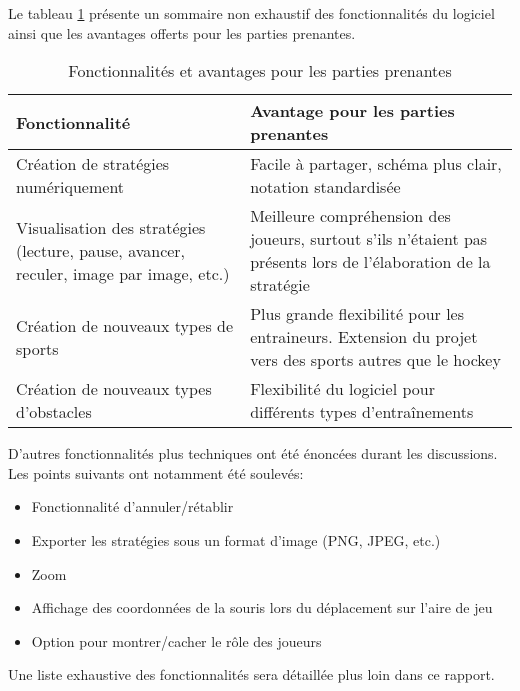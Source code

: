 Le tableau \ref{t:fonctionnalites} présente un sommaire non exhaustif des fonctionnalités du logiciel ainsi que les avantages offerts pour les parties prenantes.

\begin{table}[h]
	\begin{tabular}{|p{6cm}|p{8cm}|}
		\hline
		\bfseries{Fonctionnalité}              & \bfseries{Avantage pour les parties prenantes} \\\hline
		Création de stratégies numériquement   & Facile à partager, schéma plus clair, notation standardisée \\\hline
		Visualisation des stratégies (lecture, pause, avancer, reculer, image par image, etc.) & Meilleure compréhension des joueurs, surtout s'ils n'étaient pas présents lors de l'élaboration de la stratégie \\\hline
		Création de nouveaux types de sports   & Plus grande flexibilité pour les entraineurs. Extension du projet vers des sports autres que le hockey \\\hline
		Création de nouveaux types d'obstacles & Flexibilité du logiciel pour différents types d'entraînements \\
		\hline
	\end{tabular}
	\caption{Fonctionnalités et avantages pour les parties prenantes}
	\label{t:fonctionnalites}
\end{table}

D'autres fonctionnalités plus techniques ont été énoncées durant les discussions. Les points suivants ont notamment été soulevés:
\begin{itemize}
	\item Fonctionnalité d'annuler/rétablir
	\item Exporter les stratégies sous un format d'image (PNG, JPEG, etc.)
	\item Zoom
	\item Affichage des coordonnées de la souris lors du déplacement sur l'aire de jeu
	\item Option pour montrer/cacher le rôle des joueurs
\end{itemize}

Une liste exhaustive des fonctionnalités sera détaillée plus loin dans ce rapport.

